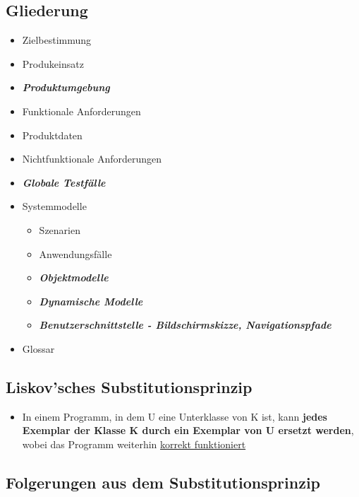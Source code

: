\newpage
\subsection{Gliederung}
		
\begin{itemize}
\item Zielbestimmung 
\item Produkeinsatz
\item \textbf{\textit{Produktumgebung}}
\item Funktionale Anforderungen
\item Produktdaten
\item Nichtfunktionale Anforderungen
\item \textbf{\textit{Globale Testfälle}}
\item Systemmodelle
\begin{itemize}
\item Szenarien
\item Anwendungsfälle
\item \textbf{\textit{Objektmodelle}}
\item \textbf{\textit{Dynamische Modelle}}
\item \textbf{\textit{Benutzerschnittstelle - Bildschirmskizze, Navigationspfade}}
\end{itemize}
\item Glossar
\end{itemize}
		
\subsection{Liskov'sches Substitutionsprinzip}
	
\begin{itemize}
\item In einem Programm, in dem U eine Unterklasse von K ist, kann \textbf{jedes Exemplar der Klasse K durch ein Exemplar von U ersetzt werden}, wobei das Programm weiterhin \underline{korrekt funktioniert}
\end{itemize}
		
\newpage
\subsection{Folgerungen aus dem Substitutionsprinzip}
	

